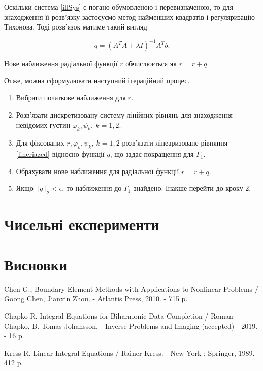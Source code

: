 \documentclass[12pt]{report}
\begin{document}
 Оскільки система \eqref{illSys} є погано обумовленою і перевизначеною, то для знаходження її розв'язку застосуємо метод найменших квадратів і регуляризацію Тихонова. Тоді розв'язок матиме такий вигляд
 
 \begin{equation}
q=(A^T A+\lambda I)^{-1}A^T b.
 \end{equation} 
 
 Нове наближення радіальної функції $r$ обчислюється як $r=r+q$.
 
 Отже, можна сформулювати наступний ітераційний процес.
\begin{enumerate}
  \item Вибрати початкове наближення для $r$.
  \item Розв'язати дискретизовану систему лінійних рівнянь для знаходження невідомих густин $\varphi_k,\psi_k, \ k=1,2$.
  \item Для фіксованих $r, \varphi_k,\psi_k, \ k=1,2$ розв'язати лінеаризоване рівняння \eqref{lineriazed} відносно функції $q$, що задає покращення для $\Gamma_1$.
  \item Обрахувати нове наближення для радіальної функції $r=r+q$.
  \item Якщо $||q||_2<\epsilon$, то наближення до $\Gamma_1$ знайдено. Інакше перейти до кроку 2.
\end{enumerate}

\chapter{Чисельні експерименти}

\chapter*{Висновки}

\begin{thebibliography}{99}
Chen G., Boundary Element Methods with Applications to Nonlinear Problems / Goong Chen, Jianxin Zhou. - Atlantis Press, 2010. - 715 p.

Chapko R. Integral Equations for Biharmonic Data Completion / Roman Chapko, B. Tomas Johansson. - Inverse Problems and Imaging (accepted) - 2019. - 16 p.
 
Kress R. Linear Integral Equations / Rainer Kress. - New York : Springer, 1989. - 412 p.

\end{thebibliography}
\end{document}
